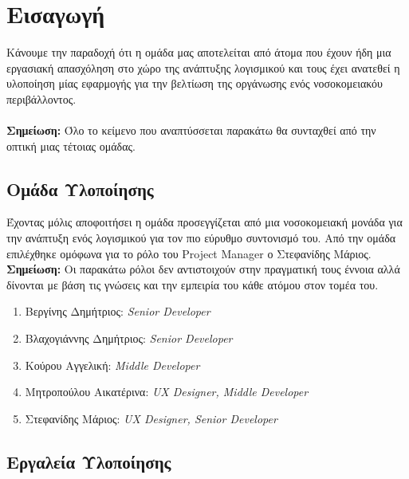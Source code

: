 \documentclass{article}
\begin{document}
{
  \hypersetup{linkcolor=black}
  \tableofcontents
}

\section{Εισαγωγή}
Κάνουμε την παραδοχή ότι η ομάδα μας αποτελείται από άτομα που έχουν ήδη μια εργασιακή απασχόληση στο χώρο της ανάπτυξης λογισμικού και τους έχει ανατεθεί η υλοποίηση μίας εφαρμογής για την βελτίωση της οργάνωσης ενός νοσοκομειακόυ περιβάλλοντος.\\ \\
\textbf{Σημείωση:} Όλο το κείμενο που αναπτύσσεται παρακάτω θα συνταχθεί από την οπτική μιας τέτοιας ομάδας.\\

\subsection{Ομάδα Υλοποίησης}
Έχοντας μόλις αποφοιτήσει η ομάδα προσεγγίζεται από μια νοσοκομειακή μονάδα για την ανάπτυξη ενός λογισμικού για τον πιο εύρυθμο συντονισμό του. Από την ομάδα επιλέχθηκε ομόφωνα για το ρόλο του Project Manager ο Στεφανίδης Μάριος.\\

\textbf{Σημείωση:} Οι παρακάτω ρόλοι δεν αντιστοιχούν στην πραγματική τους έννοια αλλά δίνονται με βάση τις γνώσεις και την εμπειρία του κάθε ατόμου στον τομέα του.
\begin{enumerate}
    \item Βεργίνης Δημήτριος: \emph{Senior Developer}
    \item Βλαχογιάννης Δημήτριος: \emph{Senior Developer}
    \item Κούρου Αγγελική: \emph{Middle Developer}
    \item Μητροπούλου Αικατέρινα: \emph{UX Designer, Middle Developer}
    \item Στεφανίδης Μάριος: \emph{UX Designer, Senior Developer}
\end{enumerate}

\subsection{Εργαλεία Υλοποίησης}
\end{document}
